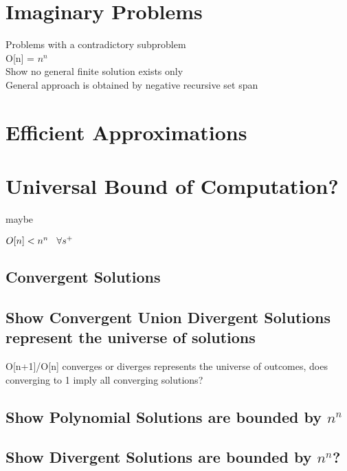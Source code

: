 \documentclass[11pt]{article}
\begin{document}
\newpage
\section{Imaginary Problems}
Problems with a contradictory subproblem\\
O[n] = $n^n$\\
Show no general finite solution exists only\\
General approach is obtained by negative recursive set span


\section{Efficient Approximations}


\newpage
\section{Universal Bound of Computation?}
maybe
\begin{center}
$
O[n] < n^n \hspace{3mm} \forall s^+
$
\end{center}

\subsection{Convergent Solutions}
\subsection{Show Convergent Union Divergent Solutions represent the universe of solutions}
O[n+1]/O[n] converges or diverges represents the universe of outcomes, does converging to 1 imply all converging solutions?

\subsection{Show Polynomial Solutions are bounded by $n^n$}
\subsection{Show Divergent Solutions are bounded by $n^n$?}









\newpage
\end{document}
